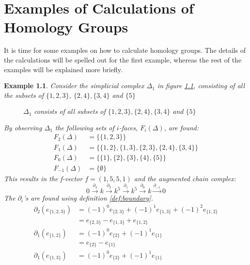 \documentclass[11pt,a4paper,twoside]{report}
\newtheorem{myex}[mythm]{Example}
\begin{document}
\chapter{Examples of Calculations of Homology Groups}
It is time for some examples on how to calculate homology groups. The details of the calculations will be spelled out for the first example, whereas the rest of the examples will be explained more briefly.
\begin{myex}
Consider the simplicial complex $\Delta_1$ in figure \ref{fig:ex1}, consisting of all the subsets of $\{1,2,3\}$, $\{2,4\},\{3,4\}$ and $\{5\}$
\begin{figure}[H]
\center
{}
\caption{$\Delta_1$ consists of all subsets of $\{1,2,3\},\{2,4\},\{3,4\}$ and $\{5\}$}
\label{fig:ex1}
\end{figure}
By observing $\Delta_1$ the following sets of $i$-faces, $F_i(\Delta)$, are found:
\begin{align*}
F_2(\Delta) &= \{\{1,2,3\}\}\\
F_1(\Delta) &= \{\{1,2\},\{1,3\},\{2,3\},\{2,4\},\{3,4\}\}\\
F_0(\Delta) &= \{\{1\},\{2\},\{3\},\{4\},\{5\}\}\\
F_{-1}(\Delta) &= \{\emptyset\}
\end{align*}
This results in the f-vector $f=(1,5,5,1)$ and the augmented chain complex:
\begin{equation*}
0\overset{\partial_3}{\longrightarrow} k\overset{\partial_2}{\longrightarrow} k^5\overset{\partial_1}{\longrightarrow} k^5\overset{\partial_0}{\longrightarrow} k \overset{\partial_{-1}}{\to} 0
\end{equation*}
The $\partial_i$'s are found using definition \ref{def:boundary}. 
\begin{align*}
\partial_2(e_{\{1,2,3\}})&=(-1)^0e_{\{2,3\}}+(-1)^1e_{\{1,3\}}+(-1)^2e_{\{1,2\}}\\
&=e_{\{2,3\}}-e_{\{1,3\}}+e_{\{1,2\}}\\
\partial_1(e_{\{1,2\}})&=(-1)^0e_{\{2\}}+(-1)^1e_{\{1\}}\\
&=e_{\{2\}}-e_{\{1\}}\\
\partial_1(e_{\{1,3\}})&=(-1)^0e_{\{3\}}+(-1)^1e_{\{1\}}\\

\end{align*}
\end{myex}
\end{document}
